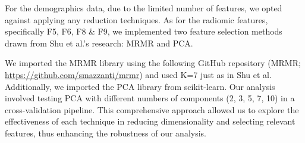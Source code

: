 For the demographics data, due to the limited number of features, we opted against applying any reduction techniques. As for the radiomic features, specifically F5, F6, F8 \& F9, we implemented two feature selection methods drawn from Shu et al.'s research: MRMR \cite{Ding_Peng} and PCA. 

We imported the MRMR library using the following GitHub repository (MRMR; \url{https://github.com/smazzanti/mrmr}) and used K=7 just as in Shu et al. Additionally, we imported the PCA library from scikit-learn. Our analysis involved testing PCA with different numbers of components (2, 3, 5, 7, 10) in a cross-validation pipeline. This comprehensive approach allowed us to explore the effectiveness of each technique in reducing dimensionality and selecting relevant features, thus enhancing the robustness of our analysis.